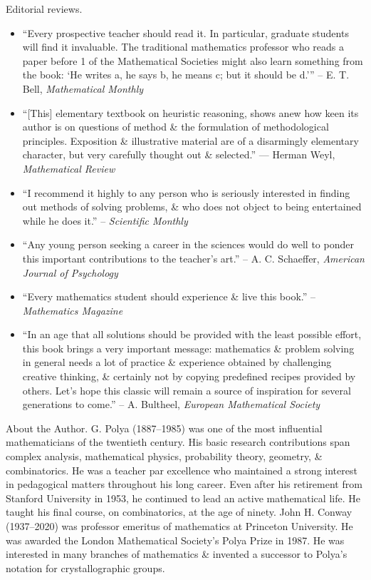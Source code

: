 \documentclass{article}
\begin{document}
\begin{enumerate}
	{\sf Editorial reviews.}
	\begin{itemize}
		\item ``Every prospective teacher should read it. In particular, graduate students will find it invaluable. The traditional mathematics professor who reads a paper before 1 of the Mathematical Societies might also learn something from the book: `He writes a, he says b, he means c; but it should be d.''' -- {\sc E. T. Bell}, {\it Mathematical Monthly}
		\item ``[This] elementary textbook on heuristic reasoning, shows anew how keen its author is on questions of method \& the formulation of methodological principles. Exposition \& illustrative material are of a disarmingly elementary character, but very carefully thought out \& selected.'' --- {\sc Herman Weyl}, {\it Mathematical Review}
		\item ``I recommend it highly to any person who is seriously interested in finding out methods of solving problems, \& who does not object to being entertained while he does it.'' -- {\it Scientific Monthly}
		\item ``Any young person seeking a career in the sciences would do well to ponder this important contributions to the teacher's art.'' -- {\sc A. C. Schaeffer}, {\it American Journal of Psychology}
		\item ``Every mathematics student should experience \& live this book.'' -- {\it Mathematics Magazine}
		\item ``In an age that all solutions should be provided with the least possible effort, this book brings a very important message: mathematics \& problem solving in general needs a lot of practice \& experience obtained by challenging creative thinking, \& certainly not by copying predefined recipes provided by others. Let's hope this classic will remain a source of inspiration for several generations to come.'' -- {\sc A. Bultheel}, {\it European Mathematical Society}
	\end{itemize}
	{\sf About the Author.} {\sc G. Polya} (1887--1985) was one of the most influential mathematicians of the twentieth century. His basic research contributions span complex analysis, mathematical physics, probability theory, geometry, \& combinatorics. He was a teacher par excellence who maintained a strong interest in pedagogical matters throughout his long career. Even after his retirement from Stanford University in 1953, he continued to lead an active mathematical life. He taught his final course, on combinatorics, at the age of ninety. John H. Conway (1937--2020) was professor emeritus of mathematics at Princeton University. He was awarded the London Mathematical Society's Polya Prize in 1987. He was interested in many branches of mathematics \& invented a successor to {\sc Polya}'s notation for crystallographic groups.
	

\end{enumerate}
\end{document}
